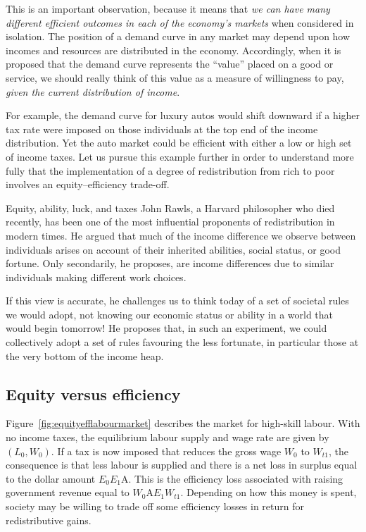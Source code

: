 This is an important observation, because it means that \textit{we can have many different efficient outcomes in each of the economy's markets} when considered in isolation. The position of a demand curve in any market may depend upon how incomes and resources are distributed in the economy. Accordingly, when it is proposed that the demand curve represents the ``value'' placed on a good or service, we should really think of this value as a measure of willingness to pay, \textit{given the current distribution of income}.

For example, the demand curve for luxury autos would shift downward if a higher tax rate were imposed on those individuals at the top end of the income distribution. Yet the auto market could be efficient with either a low or high set of income taxes. Let us pursue this example further in order to understand more fully that the implementation of a degree of redistribution from rich to poor involves an equity--efficiency trade-off.

\begin{ApplicationBox}{Equity, ability, luck, and taxes \label{app:equityabilitylucktax}}
John Rawls, a Harvard philosopher who died recently, has been one of the most influential proponents of redistribution in modern times. He argued that much of the income difference we observe between individuals arises on account of their inherited abilities, social status, or good fortune. Only secondarily, he proposes, are income differences due to similar individuals making different work choices.

\bigskip
If this view is accurate, he challenges us to think today of a set of societal rules we would adopt, not knowing our economic status or ability in a world that would begin tomorrow! He proposes that, in such an experiment, we could collectively adopt a set of rules favouring the less fortunate, in particular those at the very bottom of the income heap.
\end{ApplicationBox}

\subsection*{Equity versus efficiency}

Figure~\ref{fig:equityefflabourmarket} describes the market for high-skill labour. With no income taxes, the equilibrium labour supply and wage rate are given by $(L_0,W_0)$. If a tax is now imposed that reduces the gross wage $W_0$ to $W_{t1}$, the consequence is that less labour is supplied and there is a net loss in surplus equal to the dollar amount $E_0E_1$A. This is the efficiency loss associated with raising government revenue equal to $W_0$A$E_1W_{t1}$. Depending on how this money is spent, society may be willing to trade off some efficiency losses in return for redistributive gains. 

